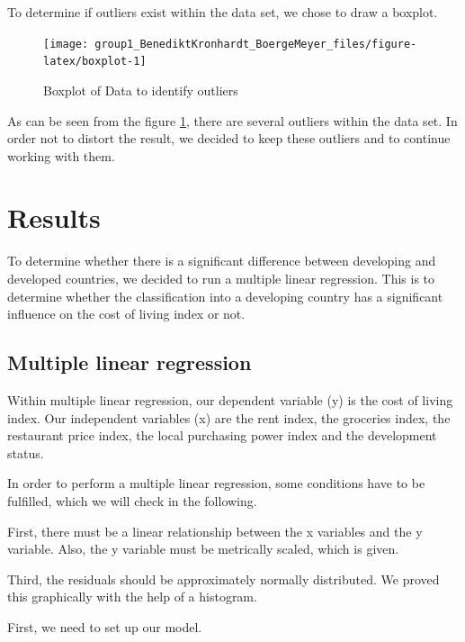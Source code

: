 \documentclass[
  11pt,
  a4paper,
  twoside]{scrbook}
\begin{document}
\linespread{1}

To determine if outliers exist within the data set, we chose to draw a boxplot.

\begin{figure}

{\centering \texttt{[image: group1\_BenediktKronhardt\_BoergeMeyer\_files/figure-latex/boxplot-1]} 

}

\caption{Boxplot of Data to identify outliers}\label{fig:boxplot}
\end{figure}

As can be seen from the figure \ref{fig:boxplot}, there are several outliers within the data set. In order not to distort the result, we decided to keep these outliers and to continue working with them.

\hypertarget{results}{%
\chapter{Results}\label{results}}

To determine whether there is a significant difference between developing and developed countries, we decided to run a multiple linear regression. This is to determine whether the classification into a developing country has a significant influence on the cost of living index or not.

\hypertarget{multiple-linear-regression}{%
\section{Multiple linear regression}\label{multiple-linear-regression}}

Within multiple linear regression, our dependent variable (y) is the cost of living index. Our independent variables (x) are the rent index, the groceries index, the restaurant price index, the local purchasing power index and the development status.

In order to perform a multiple linear regression, some conditions have to be fulfilled, which we will check in the following.

First, there must be a linear relationship between the x variables and the y variable. Also, the y variable must be metrically scaled, which is given.

Third, the residuals should be approximately normally distributed. We proved this graphically with the help of a histogram.

First, we need to set up our model.
\end{document}

